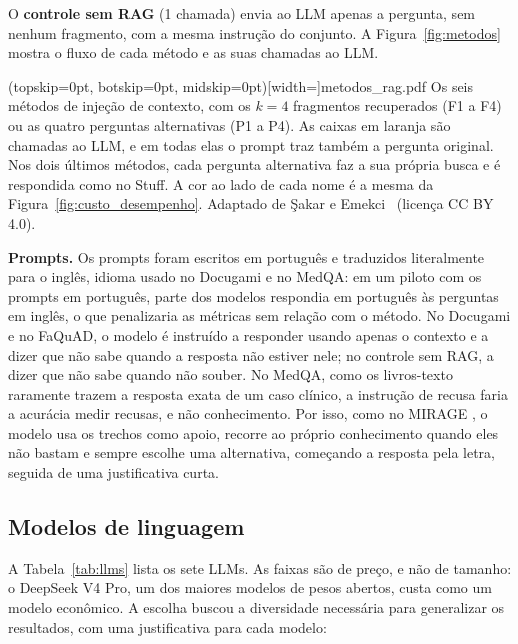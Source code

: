 O \textbf{controle sem RAG} (1 chamada) envia ao LLM apenas a pergunta, sem nenhum fragmento, com a mesma instrução do conjunto. A Figura~\ref{fig:metodos} mostra o fluxo de cada método e as suas chamadas ao LLM.

\Figure[!t](topskip=0pt, botskip=0pt, midskip=0pt)[width=\textwidth]{metodos_rag.pdf}
{Os seis métodos de injeção de contexto, com os $k = 4$ fragmentos recuperados (F1 a F4) ou as quatro perguntas alternativas (P1 a P4). As caixas em laranja são chamadas ao LLM, e em todas elas o prompt traz também a pergunta original. Nos dois últimos métodos, cada pergunta alternativa faz a sua própria busca e é respondida como no Stuff. A cor ao lado de cada nome é a mesma da Figura~\ref{fig:custo_desempenho}. Adaptado de Şakar e Emekci~\cite{sakar2025rag} (licença CC BY 4.0).\label{fig:metodos}}


\textbf{Prompts.} Os prompts foram escritos em português e traduzidos literalmente para o inglês, idioma usado no Docugami e no MedQA: em um piloto com os prompts em português, parte dos modelos respondia em português às perguntas em inglês, o que penalizaria as métricas sem relação com o método. No Docugami e no FaQuAD, o modelo é instruído a responder usando apenas o contexto e a dizer que não sabe quando a resposta não estiver nele; no controle sem RAG, a dizer que não sabe quando não souber. No MedQA, como os livros-texto raramente trazem a resposta exata de um caso clínico, a instrução de recusa faria a acurácia medir recusas, e não conhecimento. Por isso, como no MIRAGE \cite{xiong2024mirage}, o modelo usa os trechos como apoio, recorre ao próprio conhecimento quando eles não bastam e sempre escolhe uma alternativa, começando a resposta pela letra, seguida de uma justificativa curta.

\subsection{Modelos de linguagem}

A Tabela~\ref{tab:llms} lista os sete LLMs. As faixas são de preço, e não de tamanho: o DeepSeek V4 Pro, um dos maiores modelos de pesos abertos, custa como um modelo econômico. A escolha buscou a diversidade necessária para generalizar os resultados, com uma justificativa para cada modelo:


